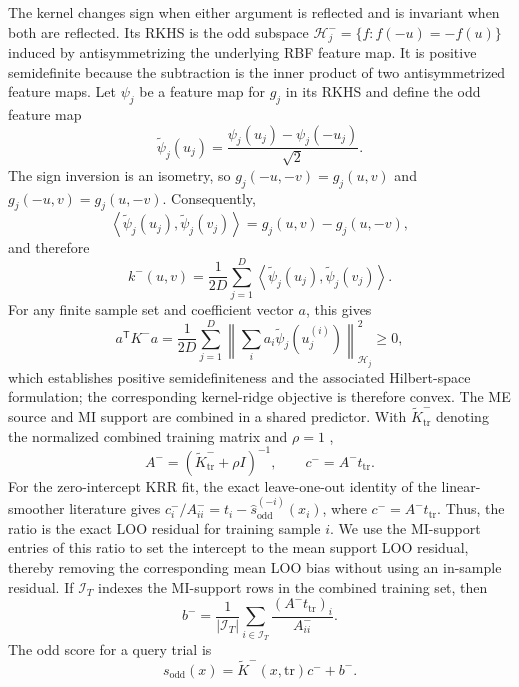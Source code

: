\documentclass[preprint,12pt]{elsarticle}
\begin{document}
The kernel changes sign when either argument is reflected and is invariant when both are reflected. Its RKHS is the odd subspace $\mathcal H^-_j=\{f: f(-u)=-f(u)\}$ induced by antisymmetrizing the underlying RBF feature map. It is positive semidefinite because the subtraction is the inner product of two antisymmetrized feature maps. Let $\psi_j$ be a feature map for $g_j$ in its RKHS and define the odd feature map
\begin{equation}
\widetilde\psi_j(u_j)=\frac{\psi_j(u_j)-\psi_j(-u_j)}{\sqrt{2}}.
\end{equation}
The sign inversion is an isometry, so $g_j(-u,-v)=g_j(u,v)$ and $g_j(-u,v)=g_j(u,-v)$. Consequently,
\begin{equation}
\left\langle\widetilde\psi_j(u_j),\widetilde\psi_j(v_j)\right\rangle
=g_j(u,v)-g_j(u,-v),
\end{equation}
and therefore
\begin{equation}
k^-(u,v)=\frac{1}{2D}\sum_{j=1}^{D}
\left\langle\widetilde\psi_j(u_j),\widetilde\psi_j(v_j)\right\rangle.
\end{equation}
For any finite sample set and coefficient vector $a$, this gives
\begin{equation}
a^{\mathsf T}K^-a=\frac{1}{2D}\sum_{j=1}^{D}
\left\|\sum_i a_i\widetilde\psi_j(u^{(i)}_j)\right\|_{\mathcal H_j}^{2}\geq0,
\end{equation}
which establishes positive semidefiniteness and the associated Hilbert-space formulation; the corresponding kernel-ridge objective is therefore convex. The ME source and MI support are combined in a shared predictor. With $\widetilde K^-_{\mathrm{tr}}$ denoting the normalized combined training matrix and $\rho=1$ \cite{hoerl1970ridge},
\begin{equation}
A^-=(\widetilde K^-_{\mathrm{tr}}+\rho I)^{-1},\qquad c^-=A^-t_{\mathrm{tr}}.
\end{equation}
For the zero-intercept KRR fit, the exact leave-one-out identity of the linear-smoother literature gives \cite{golub1979gcv} $c_i^-/A_{ii}^-=t_i-\widehat{s}_{\mathrm{odd}}^{(-i)}(x_i)$, where $c^-=A^-t_{\mathrm{tr}}$. Thus, the ratio is the exact LOO residual for training sample $i$. We use the MI-support entries of this ratio to set the intercept to the mean support LOO residual, thereby removing the corresponding mean LOO bias without using an in-sample residual. If $\mathcal I_T$ indexes the MI-support rows in the combined training set, then
\begin{equation}
b^- = \frac{1}{|\mathcal I_T|}\sum_{i\in\mathcal I_T}
\frac{(A^-t_{\mathrm{tr}})_i}{A^-_{ii}}.
\end{equation}
The odd score for a query trial is
\begin{equation}
s_{\mathrm{odd}}(x)=\widetilde K^-(x,\mathrm{tr})c^-+b^-.
\end{equation}
\end{document}
